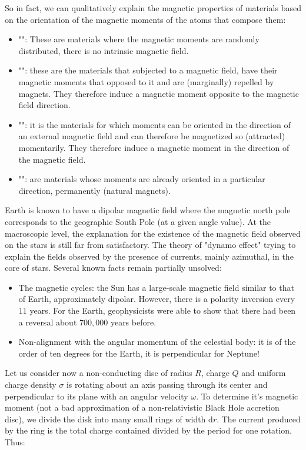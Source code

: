 	So in fact, we can qualitatively explain the magnetic properties of materials based on the orientation of the magnetic moments of the atoms that compose them:
	\begin{itemize}
		\item "": These are materials where the magnetic moments are randomly distributed, there is no intrinsic magnetic field.

		\item "": these are the materials that subjected to a magnetic field, have their magnetic moments that opposed to it and are (marginally)  repelled by magnets. They therefore induce a magnetic moment opposite to the magnetic field direction.
		
		\item "": it is the materials for which moments can be oriented in the direction of an external magnetic field and can therefore be magnetized so (attracted) momentarily. They therefore induce a magnetic moment in the direction of the magnetic field.

		\item "": are materials whose moments are already oriented in a particular direction, permanently (natural magnets).
	\end{itemize}
	\begin{tcolorbox}[title=Remark,colframe=black,arc=10pt]
	Earth is known to have a dipolar magnetic field where the magnetic north pole corresponds to the geographic South Pole (at a given angle value). At the macroscopic level, the explanation for the existence of the magnetic field observed on the stars is still far from satisfactory. The theory of "dynamo effect" trying to explain the fields observed by the presence of currents, mainly azimuthal, in the core of stars. Several known facts remain partially unsolved:
	\begin{itemize}
		\item The magnetic cycles: the Sun has a large-scale magnetic field similar to that of Earth, approximately dipolar. However, there is a polarity inversion every $11$ years. For the Earth, geophysicists were able to show that there had been a reversal about $700,000$ years before.
		
		\item Non-alignment with the angular momentum of the celestial body: it is of the order of ten degrees for the Earth, it is perpendicular for Neptune!
	\end{itemize}
	\end{tcolorbox}
		Let us consider now a non-conducting disc of radius $R$, charge $Q$ and uniform charge density $\sigma$ is rotating about an axis passing through its center and perpendicular to its plane with an angular velocity $\omega$. To determine it's magnetic moment (not a bad approximation of a non-relativistic Black Hole accretion disc), we divide the disk into many small rings of width $\mathrm{d}r$. The current produced by the ring is the total charge contained divided by the period for one rotation. Thus:
	
